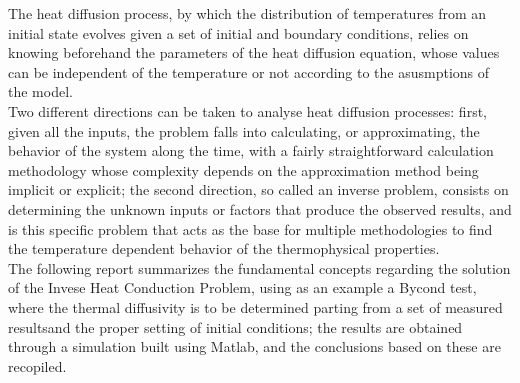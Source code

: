 The heat diffusion process, by which the distribution of temperatures from an initial state evolves given a set of initial and boundary conditions, relies on knowing beforehand the parameters of the heat diffusion equation, whose values can be independent of the temperature or not according to the asusmptions of the model.\\

Two different directions can be taken to analyse heat diffusion processes: first, given all the inputs, the problem falls into calculating, or approximating, the behavior of the system along the time, with a fairly straightforward calculation methodology whose complexity depends on the approximation method being implicit or explicit; the second direction, so called an inverse problem, consists on determining the unknown inputs or factors that produce the observed results, and is this specific problem that acts as the base for multiple methodologies to find the temperature dependent behavior of the thermophysical properties.\\

The following report summarizes the fundamental concepts regarding the solution of the Invese Heat Conduction Problem, using as an example a Bycond test, where the thermal diffusivity is to be determined parting from a set of measured resultsand the proper setting of initial conditions; the results are obtained through a simulation built using Matlab, and the conclusions based on these are recopiled.